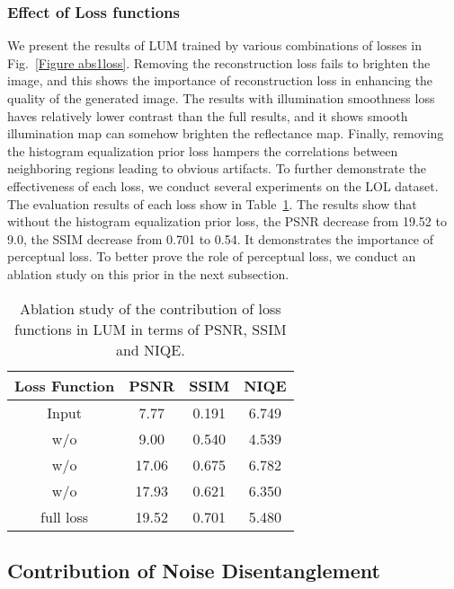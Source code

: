 \documentclass[journal]{IEEEtran}
\begin{document}
\subsubsection{Effect of Loss functions}
We present the results of LUM trained by various combinations of losses in Fig.~\ref{Figure abs1loss}. Removing the reconstruction loss  fails to brighten the image, and this shows the importance of reconstruction loss in enhancing the quality of the generated image. The results with illumination smoothness loss haves relatively lower contrast than the full results, and it shows smooth illumination map can somehow brighten the reflectance map. Finally, removing the histogram equalization prior loss  hampers the correlations between neighboring regions leading to obvious artifacts. To further demonstrate the effectiveness of each loss, we conduct several experiments on the LOL dataset. The evaluation results of each loss show in Table~\ref{table:loss1}. The results show that without the histogram equalization prior loss, the PSNR decrease from 19.52 to 9.0, the SSIM decrease from 0.701 to 0.54. It demonstrates the importance of perceptual loss. To better prove the role of perceptual loss, we conduct an ablation study on this prior in the next subsection.
\begin{table}[t]
\centering
\caption{Ablation study of the contribution of loss functions in LUM in terms of PSNR, SSIM and NIQE.}
\begin{tabular}{c|c|c|c}
\hline
\textbf{Loss Function} &\textbf{PSNR} &\textbf{SSIM} &\textbf{NIQE}\\ \hline
Input &7.77 &0.191 &6.749\\ 
w/o  &9.00 &0.540 &4.539\\ 
w/o  &17.06 &0.675 &6.782\\ 
w/o  &17.93 &0.621 &6.350\\
full loss &19.52 &0.701 &5.480\\ \hline
\end{tabular}
\label{table:loss1}
\end{table}

\subsection{Contribution of Noise Disentanglement}
\end{document}
